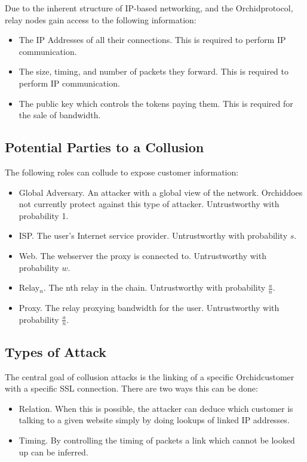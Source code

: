 \documentclass{article}
\newcommand{\orchid}{Orchid}
\newcommand{\Orchid}{\orchid}
\begin{document}
Due to the inherent structure of IP-based networking, and the \Orchid protocol, relay nodes gain access to the following information:

\begin{itemize}
\item The IP Addresses of all their connections. This is required to perform IP communication.
\item The size, timing, and number of packets they forward. This is required to perform IP communication.
\item The public key which controls the tokens paying them. This is required for the sale of bandwidth.
\end{itemize}

\subsection{Potential Parties to a Collusion}
\label{sec:collusion}

The following roles can collude to expose customer information:

\begin{itemize}
\item Global Adversary. An attacker with a global view of the network. \Orchid does not currently protect against this type of attacker. Untrustworthy with probability 1.
\item ISP. The user's Internet service provider. Untrustworthy with probability $s$.
\item Web. The webserver the proxy is connected to. Untrustworthy with probability $w$.
\item Relay$_n$. The nth relay in the chain. Untrustworthy with probability $\frac{a}{n}$.
\item Proxy. The relay proxying bandwidth for the user. Untrustworthy with probability $\frac{a}{n}$.
\end{itemize}

\subsection{Types of Attack}

The central goal of collusion attacks is the linking of a specific
\Orchid customer with a specific SSL connection. There are two ways
this can be done:

\begin{itemize}
\item Relation. When this is possible, the attacker can deduce which
  customer is talking to a given website simply by doing lookups of
  linked IP addresses.
\item Timing. By controlling the timing of packets a link which cannot
  be looked up can be inferred.
\end{itemize}
\end{document}
